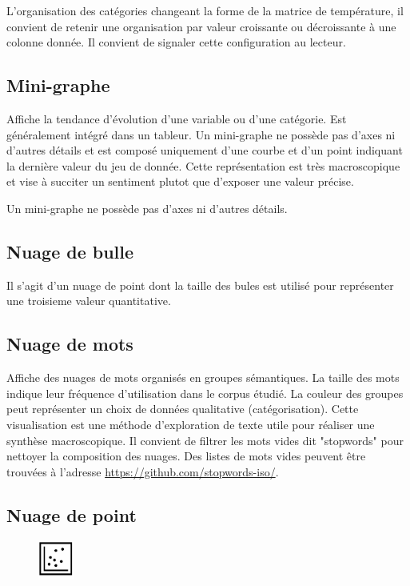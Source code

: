 \documentclass[a4paper,12pt]{article}
\begin{document}
\begin{multicols}{2}
L'organisation des catégories changeant la forme de la matrice de température, il convient de retenir une organisation par valeur croissante ou décroissante à une colonne donnée. Il convient de signaler cette configuration au lecteur. \autocite{wilkeVisualizingAmounts2019}
\subsection*{Mini-graphe}
\label{sec:org2881958}
Affiche la tendance d'évolution d'une variable ou d'une catégorie. Est généralement intégré dans un tableur. Un mini-graphe ne possède pas d'axes ni d'autres détails et est composé uniquement d'une courbe et d'un point indiquant la dernière valeur du jeu de donnée. \autocite{sosulskiGraphics2019} Cette représentation est très macroscopique et vise à succiter un sentiment plutot que d'exposer une valeur précise. \autocite{jonathanschwabishDistribution2021}

Un mini-graphe ne possède pas d'axes ni d'autres détails.
\subsection*{Nuage de bulle}
\label{sec:orgb2b74ea}
Il s'agit d'un nuage de point dont la taille des bules est utilisé pour représenter une troisieme valeur quantitative. \autocite{alansmithLexiqueVisuel}
\subsection*{Nuage de mots}
\label{sec:orgaca1f39}
Affiche des nuages de mots organisés en groupes sémantiques. La taille des mots indique leur fréquence d'utilisation dans le corpus étudié. La couleur des groupes peut représenter un choix de données qualitative (catégorisation). \autocite{sosulskiGraphics2019} Cette visualisation est une méthode d'exploration de texte utile pour réaliser une synthèse macroscopique.
Il convient de filtrer les mots vides dit "stopwords" pour nettoyer la composition des nuages. \autocite{jonathanschwabishQualitative2021} Des listes de mots vides peuvent être trouvées à l'adresse \url{https://github.com/stopwords-iso/}.
\subsection*{Nuage de point}
\label{sec:orgf63efac}
\begin{figure}
\centering
\includegraphics[width=1.2cm]{./img/icon-scatterplot.pdf}
\end{figure}


\end{multicols}
\end{document}
